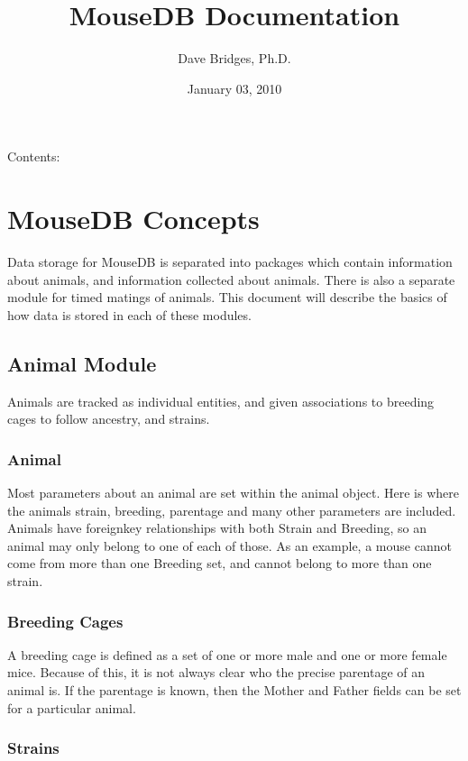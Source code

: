 \documentclass[letterpaper,10pt,english]{sphinxmanual}
\title{MouseDB Documentation}
\date{January 03, 2010}
\author{Dave Bridges, Ph.D.}
\begin{document}
\maketitle
\tableofcontents
\hypertarget{--doc-index}{}


Contents:

\resetcurrentobjects
\hypertarget{--doc-concepts}{}

\chapter{MouseDB Concepts}

Data storage for MouseDB is separated into packages which contain information about animals, and information collected about animals.  There is also a separate module for timed matings of animals.  This document will describe the basics of how data is stored in each of these modules.


\section{Animal Module}

Animals are tracked as individual entities, and given associations to breeding cages to follow ancestry, and strains.


\subsection{Animal}

Most parameters about an animal are set within the animal object.  Here is where the animals strain, breeding, parentage and many other parameters are included.  Animals have foreignkey relationships with both Strain and Breeding, so an animal may only belong to one of each of those.  As an example, a mouse cannot come from more than one Breeding set, and cannot belong to more than one strain.


\subsection{Breeding Cages}

A breeding cage is defined as a set of one or more male and one or more female mice.  Because of this, it is not always clear who the precise parentage of an animal is.  If the parentage is known, then the Mother and Father fields can be set for a particular animal.


\subsection{Strains}
\end{document}
